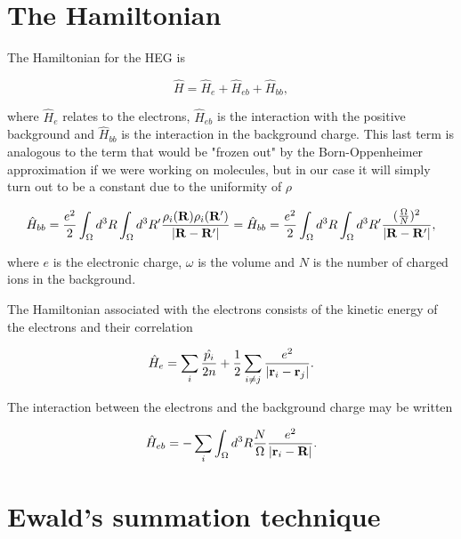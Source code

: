 \section{The Hamiltonian}

The Hamiltonian for the HEG is \cite{GrossRungeHeinonen}

\begin{equation}
\hat{H} = \hat{H}_e + \hat{H}_{eb} + \hat{H}_{bb},
\label{eqn:h_HEG}
\end{equation}

where $\hat{H}_e$ relates to the electrons, $\hat{H}_{eb}$ is the interaction with the positive background and $\hat{H}_{bb}$ is the interaction in the background charge. This last term is analogous to the term that would be "frozen out" by the Born-Oppenheimer approximation if we were working on molecules, but in our case it will simply turn out to be a constant due to the uniformity of $\rho$ \cite{GrossRungeHeinonen}

\begin{equation}
\hat{H}_{bb} = \frac{e^2}{2}  \int_{\Omega} d^3R \int_{\Omega} d^3R' \frac{\rho_i(\bold{R})\rho_i(\bold{R}')}{\vert \bold{R}-\bold{R}'\vert} = 
\hat{H}_{bb} = \frac{e^2}{2}  \int_{\Omega} d^3R \int_{\Omega} d^3R' \frac{(\frac{\Omega}{N})^2}{\vert \bold{R}-\bold{R}'\vert},
\label{eqn:h_b}
\end{equation}

where $e$ is the electronic charge, $\omega$ is the volume and $N$ is the number of charged ions in the background. 

The Hamiltonian associated with the electrons consists of the kinetic energy of the electrons and their correlation

\begin{equation}
\hat{H}_e = \sum_{i} \frac{\hat{p_i}}{2n} + \frac{1}{2} \sum_{i \neq j} \frac{e^2}{\vert \bold{r}_i - \bold{r}_j \vert }.
\label{eqn:h_electron}
\end{equation}

The interaction between the electrons and the background charge may be written

\begin{equation}
\hat{H}_{eb} = - \sum_{i} \int_\Omega d^3R \frac{N}{\Omega} \frac{e^2}{\vert \bold{r}_i - \bold{R} \vert }.
\label{eqn:h_eb}
\end{equation}

\section{Ewald's summation technique}

